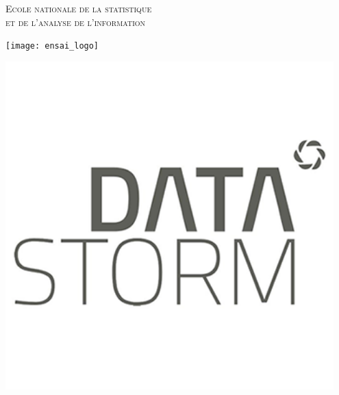 \textsc{{\LARGE Ecole nationale de la statistique \\et de l'analyse de l'information}} \\ %
\vspace{5mm}
\begin{minipage}{0.49\textwidth}
    \centering
    \texttt{[image: ensai\_logo]}\\[1.0 cm] %
\end{minipage}
\begin{minipage}{0.49\textwidth}
    \centering
    \includegraphics[width=0.95\textwidth]{Images/datastom_logo.png}\\[1.0 cm] %
\end{minipage}


